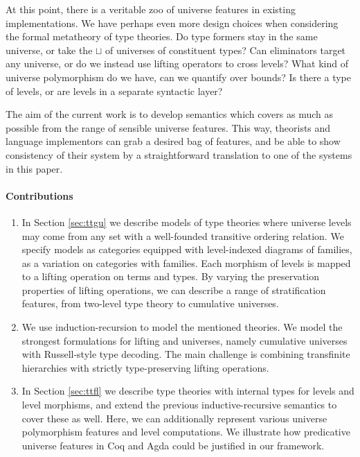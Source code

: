 \documentclass[a4paper,UKenglish,cleveref, autoref, thm-restate]{lipics-v2021}
\theoremstyle{remark}
\theoremstyle{definition}
\begin{document}
\noindent At this point, there is a veritable zoo of universe features in existing
implementations. We have perhaps even more design choices when considering the
formal metatheory of type theories. Do type formers stay in the same
universe, or take the $\sqcup$ of universes of constituent types? Can
eliminators target any universe, or do we instead use lifting operators to cross
levels? What kind of universe polymorphism do we have, can we quantify over
bounds? Is there a type of levels, or are levels in a separate syntactic layer?

The aim of the current work is to develop semantics which covers as much as
possible from the range of sensible universe features. This way, theorists and
language implementors can grab a desired bag of features, and be able to show
consistency of their system by a straightforward translation to one of the
systems in this paper.

\paragraph*{Contributions}

\begin{enumerate}
\item In Section \ref{sec:ttgu} we describe models of type theories where
  universe levels may come from any set with a well-founded transitive ordering
  relation. We specify models as categories equipped with level-indexed diagrams
  of families, as a variation on categories with families. Each morphism of
  levels is mapped to a lifting operation on terms and types. By varying the
  preservation properties of lifting operations, we can describe a range of
  stratification features, from two-level type theory to cumulative universes.
\item We use induction-recursion to model the mentioned theories. We model
  the strongest formulations for lifting and universes, namely cumulative
  universes with Russell-style type decoding. The main challenge is combining
  transfinite hierarchies with strictly type-preserving lifting operations.
\item In Section \ref{sec:ttfl} we describe type theories with internal types
  for levels and level morphisms, and extend the previous inductive-recursive
  semantics to cover these as well. Here, we can additionally represent various
  universe polymorphism features and level computations. We illustrate how
  predicative universe features in Coq and Agda could be justified in our framework.
\end{enumerate}
\end{document}
